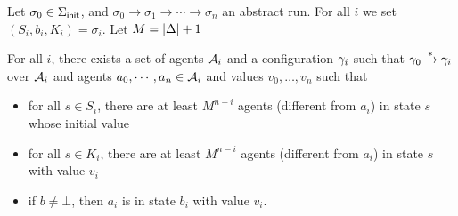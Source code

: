 %	
%	
%	
%	
%	
%	


\begin{lemma}
	\label{lem:correctness-construction}
	Let $\sigma_0 \in \Sigma_{\mathsf{init}}$, and $\sigma_0 \to \sigma_1 \to \cdots \to \sigma_n$ an abstract run. For all $i$ we set $(S_i, b_i, K_i) = \sigma_i$. Let $M = |\Delta|+1$
	
	For all $i$, there exists a set of agents $\mathcal{A}_i$ and a configuration $\gamma_i$ such that $\gamma_0 \xrightarrow{*} \gamma_i$ over $\mathcal{A}_i$ and agents $a_0, \cdots, a_n \in \mathcal{A}_i$ and values $v_0, \ldots, v_n$ such that 
	\begin{itemize}
		\item for all $s \in S_i$, there are at least $M^{n-i}$ agents (different from $a_i$) in state $s$ whose initial value 
		
		\item for all $s \in K_i$, there are at least $M^{n-i}$ agents (different from $a_i$) in state $s$ with value $v_i$
		
		\item if $b \neq \bot$, then $a_i$ is in state $b_i$ with value $v_i$.
	\end{itemize}
\end{lemma}


